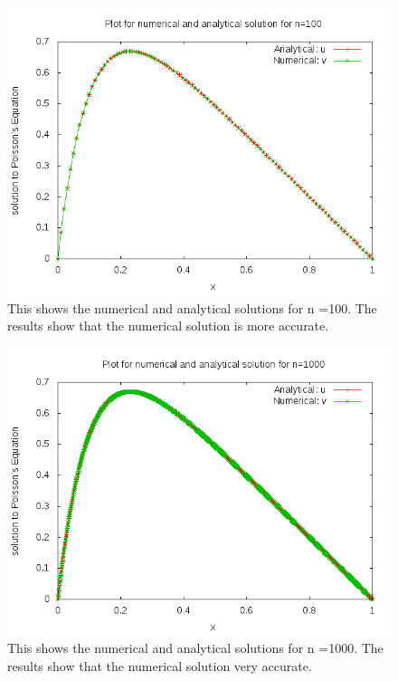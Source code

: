 \documentclass[11pt,a4wide]{article}
\begin{document}
\begin{figure}[H]
\centering
\includegraphics[width=120mm]{Hundred.png}
\caption{This shows the numerical and analytical solutions for n =100. The results show that the numerical solution is more accurate. \label{overflow}}
\end{figure}
\begin{figure}[H]
\centering
\includegraphics[width=120mm]{Thousand.png}
\caption{This shows the numerical and analytical solutions for n =1000. The results show that the numerical solution very accurate. \label{overflow}}
\end{figure}
\end{document}
